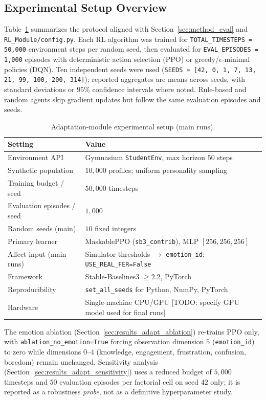 \subsection{Experimental Setup Overview}\label{sec:results_adapt_setup}

Table~\ref{tab:adapt_experiment_setup} summarizes the protocol aligned with Section~\ref{sec:method_eval} and \texttt{RL\_Module/config.py}. Each RL algorithm was trained for \texttt{TOTAL\_TIMESTEPS = 50{,}000} environment steps per random seed, then evaluated for \texttt{EVAL\_EPISODES = 1{,}000} episodes with deterministic action selection (PPO) or greedy/$\epsilon$-minimal policies (DQN). Ten independent seeds were used (\texttt{SEEDS = [42, 0, 1, 7, 13, 21, 99, 100, 200, 314]}); reported aggregates are means across seeds, with standard deviations or $95\%$ confidence intervals where noted. Rule-based and random agents skip gradient updates but follow the same evaluation episodes and seeds.

\begin{table}[H]
\centering
\caption{Adaptation-module experimental setup (main runs).}
\label{tab:adapt_experiment_setup}
\begin{tabular}{ll}
\toprule
\textbf{Setting} & \textbf{Value} \\
\midrule
Environment API & Gymnasium \texttt{StudentEnv}, max horizon $50$ steps \\
Synthetic population & $10{,}000$ profiles; uniform personality sampling \\
Training budget / seed & $50{,}000$ timesteps \\
Evaluation episodes / seed & $1{,}000$ \\
Random seeds (main) & $10$ fixed integers \\
Primary learner & MaskablePPO (\texttt{sb3\_contrib}), MLP $[256,256,256]$ \\
Affect input (main runs) & Simulator thresholds $\rightarrow$ \texttt{emotion\_id}; \texttt{USE\_REAL\_FER=False} \\
Framework & Stable-Baselines3 $\geq 2.2$, PyTorch \\
Reproducibility & \texttt{set\_all\_seeds} for Python, NumPy, PyTorch \\
Hardware & Single-machine CPU/GPU [TODO: specify GPU model used for final runs] \\
\bottomrule
\end{tabular}
\end{table}

The emotion ablation (Section~\ref{sec:results_adapt_ablation}) re-trains PPO only, with \texttt{ablation\_no\_emotion=True} forcing observation dimension $5$ (\texttt{emotion\_id}) to zero while dimensions $0$--$4$ (knowledge, engagement, frustration, confusion, boredom) remain unchanged. Sensitivity analysis (Section~\ref{sec:results_adapt_sensitivity}) uses a reduced budget of $5{,}000$ timesteps and $50$ evaluation episodes per factorial cell on seed $42$ only; it is reported as a robustness \emph{probe}, not as a definitive hyperparameter study.

